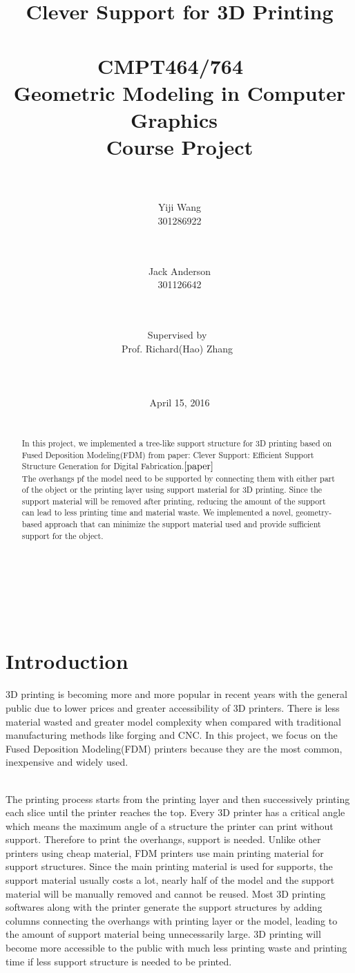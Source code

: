 \documentclass[11pt, a4paper]{article}
\title{\huge\textbf{Clever Support for 3D Printing}\\~\\\large CMPT464/764 ~\\Geometric Modeling in Computer Graphics~\\Course Project}
\author{~\\~\\Yiji Wang\\301286922 \and ~\\~\\Jack Anderson\\301126642 }
\date{~\\~\\Supervised by~\\Prof. Richard(Hao) Zhang~\\~\\~\\~\\April 15, 2016}
\begin{document}
    \maketitle
    \thispagestyle{empty}
    ~\\~\\~\\
    \begin{abstract}
        ~\\In this project, we implemented a tree-like support structure for 3D printing based on Fused Deposition Modeling(FDM) from paper: Clever Support: Efficient Support Structure Generation for Digital Fabrication.$\cite{paper}$~\\The overhangs pf the model need to be supported by connecting them with either part of the object or the printing layer using support material for 3D printing. Since the support material will be removed after printing, reducing the amount of the support can lead to less printing time and material waste. We implemented a novel, geometry-based approach that can minimize the support material used and provide sufficient support for the object.
    \end{abstract}
    \newpage
    \linespread{2}
    \tableofcontents
    \thispagestyle{empty}
	\newpage
	\linespread{1}
	\section{Introduction}
	\setcounter{page}{1}
	3D printing is becoming more and more popular in recent years with the general public due to lower prices and greater accessibility of 3D printers. There is less material wasted and greater model complexity when compared with traditional manufacturing methods like forging and CNC. In this project, we focus on the Fused Deposition Modeling(FDM) printers because they are the most common, inexpensive and widely used.
	
	~\\The printing process starts from the printing layer and then successively printing each slice until the printer reaches the top. Every 3D printer has a critical angle which means the maximum angle of a structure the printer can print without support. Therefore to print the overhangs, support is needed. Unlike other printers using cheap material, FDM printers use main printing material for support structures. Since the main printing material is used for supports, the support material usually costs a lot, nearly half of the model and the support material will be manually removed and cannot be reused. Most 3D printing softwares along with the printer generate the support structures by adding columns connecting the overhangs with printing layer or the model, leading to the amount of support material being unnecessarily large. 3D printing will become more accessible to the public with much less printing waste and printing time if less support structure is needed to be printed.
\end{document}
